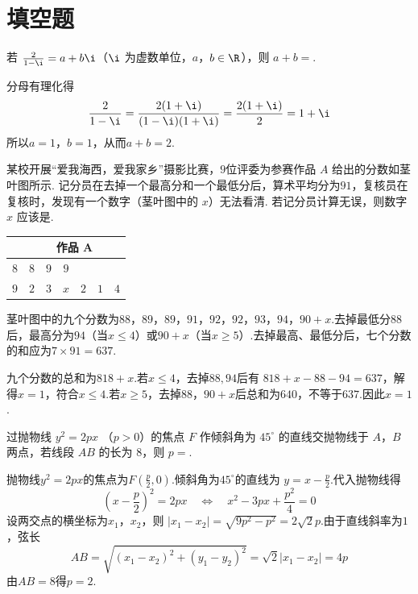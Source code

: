 \section{填空题}

\begin{problem}
若 \( \frac{2}{1 - \i} = a + b\i \)（\(\i\) 为虚数单位，\(a\)，\(b\in\R\)），则 \(a+b=\)\fillinblank{}.

\begin{solution}
分母有理化得
\[
\frac{2}{1-\i}=\frac{2(1+\i)}{(1-\i)(1+\i)}=\frac{2(1+\i)}{2}=1+\i
\]
所以\(a=1\)，\(b=1\)，从而\(a+b=2\).
\end{solution}
\end{problem}

\begin{problem}
某校开展“爱我海西，爱我家乡”摄影比赛，\(9\)位评委为参赛作品 \(A\) 给出的分数如茎叶图所示. 记分员在去掉一个最高分和一个最低分后，算术平均分为\(91\)，复核员在复核时，发现有一个数字（茎叶图中的 \(x\)）无法看清. 若记分员计算无误，则数字 \(x\) 应该是\fillinblank{}.

\begin{center}
\begin{tabular}{c|cccccc}
\phantom{8} & \multicolumn{6}{|c}{作品 A} \\
\hline
\(8\) & \(8\) & \(9\) & \(9\) & & & \\
\(9\) & \(2\) & \(3\) & \(x\) & \(2\) & \(1\) & \(4\)
\end{tabular}
\end{center}

\begin{solution}
茎叶图中的九个分数为\(88\)，\(89\)，\(89\)，\(91\)，\(92\)，\(92\)，\(93\)，\(94\)，\(90+x\).去掉最低分\(88\)后，最高分为\(94\)（当\(x\leqslant4\)）或\(90+x\)（当\(x\geqslant5\)）.去掉最高、最低分后，七个分数的和应为\(7\times91=637\).

九个分数的总和为\(818+x\).若\(x\leqslant4\)，去掉\(88,94\)后有
\(818+x-88-94=637\)，解得\(x=1\)，符合\(x\leqslant4\).若\(x\geqslant5\)，去掉\(88\)，\(90+x\)后总和为\(640\)，不等于\(637\).因此\(x=1\).
\end{solution}
\end{problem}

\begin{problem}
过抛物线 \( y^{2} = 2px  \) （\(p > 0\)）的焦点 \(F\) 作倾斜角为 \( 45^{\circ} \) 的直线交抛物线于 \(A\)，\(B\) 两点，若线段 \(AB\) 的长为 \( 8 \)，则 \( p = \)\fillinblank{}.

\begin{solution}
抛物线\(y^2=2px\)的焦点为\(F\left(\frac{p}{2},0\right)\).倾斜角为\(45^{\circ}\)的直线为
\(y=x-\frac{p}{2}\).代入抛物线得
\[
\left(x-\frac{p}{2}\right)^2=2px
\quad\Longleftrightarrow\quad
x^2-3px+\frac{p^2}{4}=0
\]
设两交点的横坐标为\(x_1\)，\(x_2\)，则
\(\lvert x_1-x_2\rvert=\sqrt{9p^2-p^2}=2\sqrt{2}p\).由于直线斜率为\(1\)，弦长
\[
AB=\sqrt{(x_1-x_2)^2+(y_1-y_2)^2}
=\sqrt{2}\lvert x_1-x_2\rvert=4p
\]
由\(AB=8\)得\(p=2\).
\end{solution}
\end{problem}

